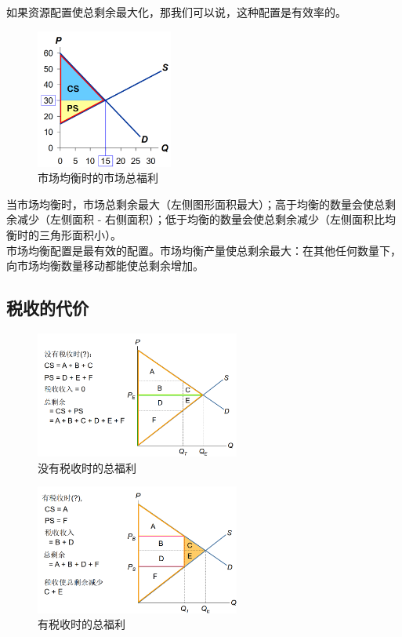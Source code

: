 \documentclass[12pt,a4paper]{article}
\begin{document}
如果资源配置使总剩余最大化，那我们可以说，这种配置是有效率的。\\
\begin{figure}[H] 
  \centering %
  \includegraphics[width=0.4\textwidth]{市场总福利.png} 
  \caption{市场均衡时的市场总福利} %
\end{figure}
当市场均衡时，市场总剩余最大（左侧图形面积最大）；高于均衡的数量会使总剩余减少（左侧面积 - 右侧面积）；低于均衡的数量会使总剩余减少（左侧面积比均衡时的三角形面积小）。\\

市场均衡配置是最有效的配置。市场均衡产量使总剩余最大：在其他任何数量下，向市场均衡数量移动都能使总剩余增加。

\subsection{税收的代价}
\begin{figure}[H] 
  \centering %
  \includegraphics[width=0.6\textwidth]{没有税收时的总福利.png} 
  \caption{没有税收时的总福利} %
\end{figure}
\begin{figure}[H] 
  \centering %
  \includegraphics[width=0.6\textwidth]{有税收时的总福利.png} 
  \caption{有税收时的总福利} %
\end{figure}
\end{document}
